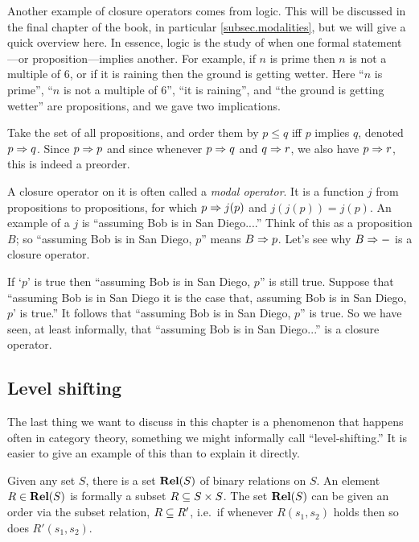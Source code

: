 \documentclass[7Sketches]{subfiles}
\begin{document}
\begin{example}%
\label{ex.modal_operator}%
Another example of closure operators comes from logic. This will be discussed in the final chapter of the book, in particular \cref{subsec.modalities}, but we will give a quick overview here. In essence, logic is the study of when one formal statement---or proposition---implies another. For example, if $n$ is prime then $n$ is not a multiple of $6$, or if it is raining then the ground is getting wetter. Here ``$n$ is prime'', ``$n$ is not a multiple of $6$'', ``it is raining'', and ``the ground is getting wetter'' are propositions, and we gave two implications.

Take the set of all propositions, and order them by $p\leq q$ iff $p$ implies $q$, denoted $p\imp q$. Since $p\imp p$ and since whenever $p\imp q$ and $q\imp r$, we also have $p\imp r$, this is indeed a preorder.

A closure operator on it is often called a \emph{modal operator}. It is a function $j$
from propositions to propositions, for which $p\imp j(p)$ and $j(j(p))= j(p)$. An
example of a $j$ is ``assuming Bob is in San Diego....'' Think of this as a proposition $B$; so ``assuming Bob is in San Diego, $p$'' means $B\imp p$. Let's see why $B\imp -$ is a closure operator.

If `$p$' is true then
``assuming Bob is in San Diego, $p$'' is still true. Suppose that ``assuming Bob
is in San Diego it is the case that, assuming Bob is in San Diego, $p$' is true.''
It follows that ``assuming Bob is in San Diego, $p$'' is true. So we have seen, at least informally, that ``assuming Bob is in San Diego...'' is a closure operator.
\end{example}
%

\subsection{Level shifting} %
\label{ssec.level_shift}%

The last thing we want to discuss in this chapter is a phenomenon that happens often in category theory, something we might informally call ``level-shifting.'' It is easier to give an example of this than to explain it directly.

Given any set $S$, there is a set $\Cat{Rel}(S)$ of binary relations on $S$. An element $R\in\Cat{Rel}(S)$ is formally a subset $R\ss S\times S$. The set $\Cat{Rel}(S)$ can be given an order via the subset relation, $R\ss R'$, i.e.\ if whenever $R(s_1,s_2)$ holds then so does $R'(s_1,s_2)$.%
\end{document}
